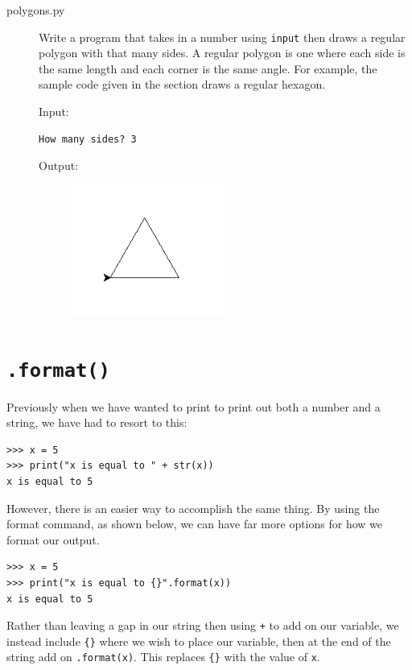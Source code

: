 \documentclass[11pt,hidelinks]{article}
\begin{document}
\begin{description}
  \item[polygons.py] Write a program that takes in a number using \lstinline{input} then draws a regular polygon with that many sides. A regular polygon is one where each side is the same length and each corner is the same angle. For example, the sample code given in the section draws a regular hexagon.

    Input:
    \begin{lstlisting}[style=ipython]
How many sides? 3
    \end{lstlisting}

    Output:
    \begin{figure}[h]
      \centering
      \includegraphics[width=2.0in]{img/triangle}
    \end{figure}
\end{description}


\pagebreak
\section{\texttt{.format()}}
Previously when we have wanted to print to print out both a number and a string, we have had to resort to this:

\begin{lstlisting}[style=ipython]
>>> x = 5
>>> print("x is equal to " + str(x))
x is equal to 5
\end{lstlisting}

However, there is an easier way to accomplish the same thing. By using the format command, as shown below, we can have far more options for how we format our output.

\begin{lstlisting}[style=ipython]
>>> x = 5
>>> print("x is equal to {}".format(x))
x is equal to 5
\end{lstlisting}

Rather than leaving a gap in our string then using \lstinline{+} to add on our variable, we instead include \lstinline!{}! where we wish to place our variable, then at the end of the string add on \lstinline{.format(x)}. This replaces \lstinline!{}! with the value of \lstinline{x}.
\end{document}
